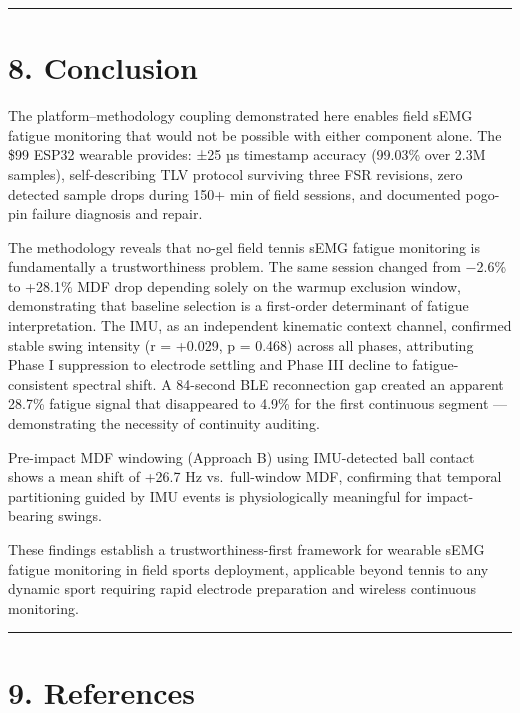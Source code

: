 \documentclass[sensors,article,submit,pdftex,moreauthors]{Definitions/mdpi}
\begin{document}
\begin{center}\rule{0.5\linewidth}{0.5pt}\end{center}

\section{8. Conclusion}\label{conclusion}

The platform--methodology coupling demonstrated here enables field sEMG fatigue monitoring
that would not be possible with either component alone. The \$99 ESP32 wearable provides:
±25 µs timestamp accuracy (99.03\% over 2.3M samples), self-describing TLV protocol surviving
three FSR revisions, zero detected sample drops during 150+ min of field sessions, and documented
pogo-pin failure diagnosis and repair.

The methodology reveals that no-gel field tennis sEMG fatigue monitoring is fundamentally a
trustworthiness problem. The same session changed from −2.6\% to +28.1\% MDF drop depending
solely on the warmup exclusion window, demonstrating that baseline selection is a first-order
determinant of fatigue interpretation. The IMU, as an independent kinematic context channel,
confirmed stable swing intensity (r = +0.029, p = 0.468) across all phases, attributing Phase I
suppression to electrode settling and Phase III decline to fatigue-consistent spectral shift.
A 84-second BLE reconnection gap created an apparent 28.7\% fatigue signal that disappeared to
4.9\% for the first continuous segment --- demonstrating the necessity of continuity auditing.

Pre-impact MDF windowing (Approach B) using IMU-detected ball contact shows a mean shift of
+26.7 Hz vs.~full-window MDF, confirming that temporal partitioning guided by IMU events is
physiologically meaningful for impact-bearing swings.

These findings establish a trustworthiness-first framework for wearable sEMG fatigue monitoring
in field sports deployment, applicable beyond tennis to any dynamic sport requiring rapid
electrode preparation and wireless continuous monitoring.

\begin{center}\rule{0.5\linewidth}{0.5pt}\end{center}

\section{9. References}\label{references}
\end{document}
